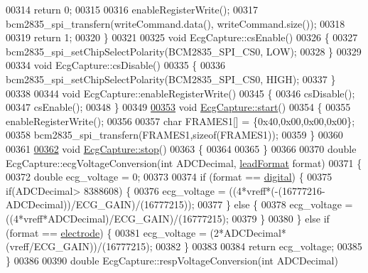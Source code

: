 \begin{DoxyCode}
00314         \textcolor{keywordflow}{return} 0;
00315 
00316     enableRegisterWrite();
00317     bcm2835\_spi\_transfern(writeCommand.data(), writeCommand.size());
00318 
00319     \textcolor{keywordflow}{return} 1;
00320 \}
00321 
00325 \textcolor{keywordtype}{void} EcgCapture::csEnable()
00326 \{
00327     bcm2835\_spi\_setChipSelectPolarity(BCM2835\_SPI\_CS0, LOW);
00328 \}
00329 
00334 \textcolor{keywordtype}{void} EcgCapture::csDisable()
00335 \{
00336     bcm2835\_spi\_setChipSelectPolarity(BCM2835\_SPI\_CS0, HIGH);
00337 \}
00338 
00344 \textcolor{keywordtype}{void} EcgCapture::enableRegisterWrite()
00345 \{
00346     csDisable();
00347     csEnable();
00348 \}
00349 
\hypertarget{ecgcapture_8cpp_source.tex_l00353}{}\hyperlink{group__Device-Facade_ga9582047c81db34a3cab2bb315fcb1793}{00353} \textcolor{keywordtype}{void} \hyperlink{group__Device-Facade_ga9582047c81db34a3cab2bb315fcb1793}{EcgCapture::start}()
00354 \{
00355     enableRegisterWrite();
00356 
00357     \textcolor{keywordtype}{char} FRAMES1[] = \{0x40,0x00,0x00,0x00\};
00358     bcm2835\_spi\_transfern(FRAMES1,\textcolor{keyword}{sizeof}(FRAMES1));
00359 \}
00360 
00361 
\hypertarget{ecgcapture_8cpp_source.tex_l00362}{}\hyperlink{group__Device-Facade_ga8fef74cdd0296256ab4a700dae2d02a4}{00362} \textcolor{keywordtype}{void} \hyperlink{group__Device-Facade_ga8fef74cdd0296256ab4a700dae2d02a4}{EcgCapture::stop}()
00363 \{ 
00364 
00365 \}
00366 
00370 \textcolor{keywordtype}{double} EcgCapture::ecgVoltageConversion(\textcolor{keywordtype}{int} ADCDecimal, \hyperlink{group__Device-Facade_ga1750ac59389b67ba4d9d2834dd7c2d9c}{leadFormat} format)
00371 \{
00372     \textcolor{keywordtype}{double} ecg\_voltage = 0;
00373 
00374     \textcolor{keywordflow}{if} (format == \hyperlink{group__Device-Facade_gga1750ac59389b67ba4d9d2834dd7c2d9caf7786dce131009aa61ddfed4f8d8639b}{digital}) \{
00375         \textcolor{keywordflow}{if}(ADCDecimal> 8388608) \{
00376             ecg\_voltage = ((4*vreff*(-(16777216-ADCDecimal))/ECG\_GAIN)/(16777215));
00377         \} \textcolor{keywordflow}{else} \{
00378             ecg\_voltage = ((4*vreff*ADCDecimal)/ECG\_GAIN)/(16777215);
00379         \}
00380     \} \textcolor{keywordflow}{else} \textcolor{keywordflow}{if} (format == \hyperlink{group__Device-Facade_gga1750ac59389b67ba4d9d2834dd7c2d9ca21cabce4f74afcf79d24897058fdd6b9}{electrode}) \{
00381         ecg\_voltage = (2*ADCDecimal*(vreff/ECG\_GAIN))/(16777215);
00382     \}
00383 
00384     \textcolor{keywordflow}{return} ecg\_voltage;
00385 \}
00386 
00390 \textcolor{keywordtype}{double} EcgCapture::respVoltageConversion(\textcolor{keywordtype}{int} ADCDecimal)

\end{DoxyCode}
